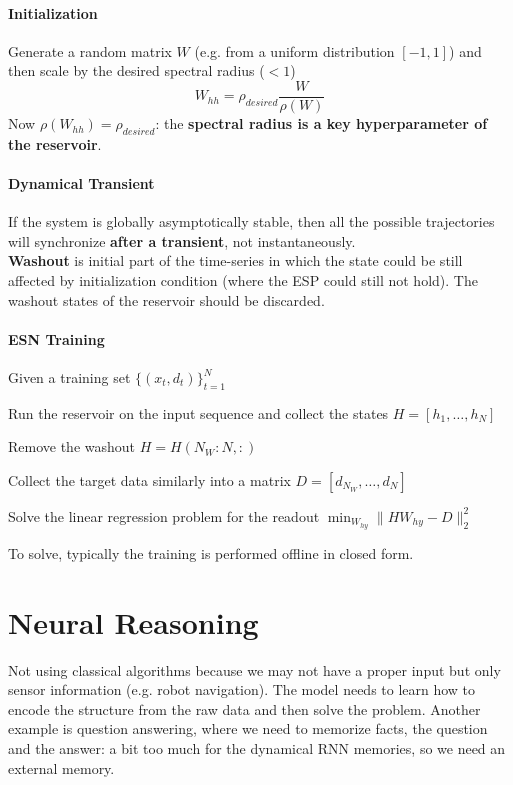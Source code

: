 \documentclass[10pt]{report}
\begin{document}
\paragraph{Initialization} Generate a random matrix $W$ (e.g. from a uniform distribution $[-1,1]$) and then scale by the desired spectral radius ($<1$) $$W_{hh} =\rho_{desired}\frac{W}{\rho(W)}$$
Now $\rho(W_{hh}) = \rho_{desired}$: the \textbf{spectral radius is a key hyperparameter of the reservoir}.
\paragraph{Dynamical Transient} If the system is globally asymptotically stable, then all the possible trajectories will synchronize \textbf{after a transient}, not instantaneously.\\
\textbf{Washout} is initial part of the time-series in which the state could be still affected by initialization condition (where the ESP could still not hold). The washout states of the reservoir should be discarded.
\paragraph{ESN Training}
\begin{list}{}{}
	\item Given a training set $\{(x_t,d_t)\}_{t=1}^N$
	\item Run the reservoir on the input sequence and collect the states $H=[h_1,\ldots,h_N]$
	\item Remove the washout $H = H(N_W:N,:)$
	\item Collect the target data similarly into a matrix $D = [d_{N_W},\ldots,d_N]$
	\item Solve the linear regression problem for the readout $\min_{W_{hy}}\|HW_{hy}-D \|^2_2$
\end{list}
To solve, typically the training is performed offline in closed form.
\section{Neural Reasoning}
Not using classical algorithms because we may not have a proper input but only sensor information (e.g. robot navigation). The model needs to learn how to encode the structure from the raw data and then solve the problem. Another example is question answering, where we need to memorize facts, the question and the answer: a bit too much for the dynamical RNN memories, so we need an external memory.
\end{document}
